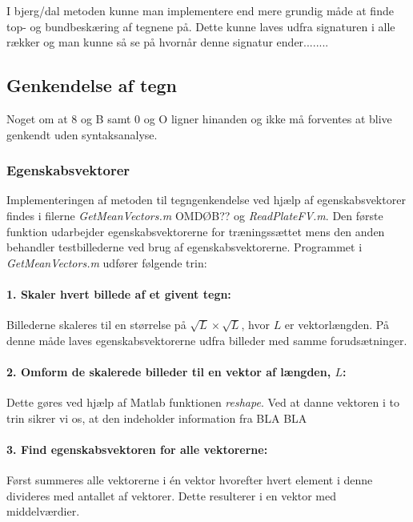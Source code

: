 I bjerg/dal metoden kunne man implementere end mere grundig måde at finde top- og bundbeskæring af tegnene på. Dette kunne laves udfra signaturen i alle rækker og man kunne så se på hvornår denne signatur ender........



\subsection{Genkendelse af tegn}

Noget om at 8 og B samt 0 og O ligner hinanden og ikke må forventes at blive genkendt uden syntaksanalyse.

\subsubsection{Egenskabsvektorer}

Implementeringen af metoden til tegngenkendelse ved hjælp af egenskabsvektorer findes i filerne \textit{GetMeanVectors.m} OMDØB?? og \textit{ReadPlateFV.m}. Den første funktion udarbejder egenskabsvektorerne for træningssættet mens den anden behandler testbillederne ved brug af egenskabsvektorerne. Programmet i \textit{GetMeanVectors.m} udfører følgende trin:

\paragraph{1. Skaler hvert billede af et givent tegn:} Billederne skaleres til en størrelse på $\sqrt{L} \times \sqrt{L}$, hvor $L$ er vektorlængden. På denne måde laves egenskabsvektorerne udfra billeder med samme forudsætninger.

\paragraph{2. Omform de skalerede billeder til en vektor af længden, $L$:} Dette gøres ved hjælp af Matlab funktionen \textit{reshape}. Ved at danne vektoren i to trin sikrer vi os, at den indeholder information fra  BLA BLA

\paragraph{3. Find egenskabsvektoren for alle vektorerne:} Først summeres alle vektorerne i én vektor hvorefter hvert element i denne divideres med antallet af vektorer. Dette resulterer i en vektor med middelværdier.

